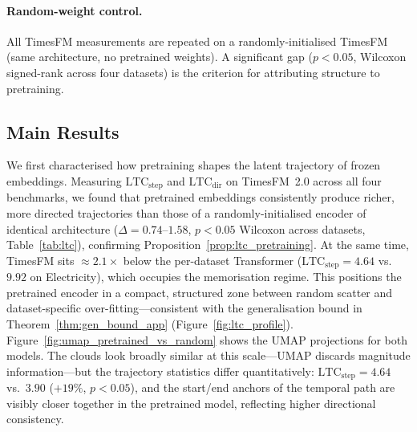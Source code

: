 \documentclass[10pt]{article}
\theoremstyle{definition}
\theoremstyle{remark}
\newcommand{\ltcstep}{\ensuremath{\mathrm{LTC}_{\mathrm{step}}}}
\newcommand{\ltcdir}{\ensuremath{\mathrm{LTC}_{\mathrm{dir}}}}
\begin{document}
\paragraph{Random-weight control.}
All TimesFM measurements are repeated on a randomly-initialised TimesFM
(same architecture, no pretrained weights).
A significant gap ($p{<}0.05$, Wilcoxon signed-rank across four datasets)
is the criterion for attributing structure to pretraining.

\subsection{Main Results}
\label{sec:results}

We first characterised how pretraining shapes the latent trajectory of frozen
embeddings.
Measuring $\ltcstep$ and $\ltcdir$ on TimesFM~2.0 across all four benchmarks,
we found that pretrained embeddings consistently produce richer, more directed
trajectories than those of a randomly-initialised encoder of identical
architecture ($\Delta{=}0.74$--$1.58$, $p{<}0.05$ Wilcoxon across datasets,
Table~\ref{tab:ltc}), confirming Proposition~\ref{prop:ltc_pretraining}.
At the same time, TimesFM sits ${\approx}2.1\times$ below the per-dataset Transformer
($\ltcstep{=}4.64$ vs.\ $9.92$ on Electricity), which occupies the
memorisation regime.
This positions the pretrained encoder in a compact, structured zone between
random scatter and dataset-specific over-fitting---consistent with the
generalisation bound in Theorem~\ref{thm:gen_bound_app}
(Figure~\ref{fig:ltc_profile}).
Figure~\ref{fig:umap_pretrained_vs_random} shows the UMAP projections for
both models.
The clouds look broadly similar at this scale---UMAP discards magnitude
information---but the trajectory statistics differ quantitatively:
$\ltcstep{=}4.64$ vs.\ $3.90$ ($+19\%$, $p{<}0.05$), and the start/end
anchors of the temporal path are visibly closer together in the pretrained
model, reflecting higher directional consistency.
\end{document}
